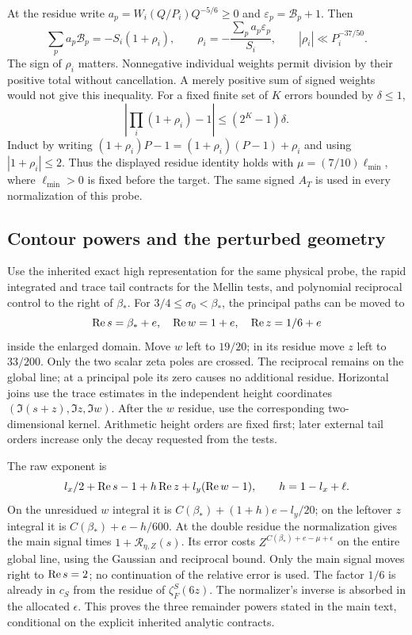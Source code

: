 At the residue write $a_p=W_i(Q/P_i)Q^{-5/6}\ge0$ and
$\varepsilon_p=\mathcal B_p+1$. Then
\[
 \sum_pa_p\mathcal B_p=-S_i(1+\rho_i),\qquad
 \rho_i=-\frac{\sum_pa_p\varepsilon_p}{S_i},\qquad
 |\rho_i|\ll P_i^{-37/50}.
\]
The sign of $\rho_i$ matters. Nonnegative individual weights permit
division by their positive total without cancellation. A merely positive
sum of signed weights would not give this inequality.
For a fixed finite set of $K$ errors bounded by $\delta\le1$,
\[
 \left|\prod_i(1+\rho_i)-1\right|\le(2^K-1)\delta.
\]
Induct by writing $(1+\rho_i)P-1=(1+\rho_i)(P-1)+\rho_i$ and using
$|1+\rho_i|\le2$. Thus the displayed residue identity holds with
$\mu=(7/10)\ell_{\min}$, where $\ell_{\min}>0$ is fixed before the target.
The same signed $A_T$ is used in every normalization of this probe.

\subsection{Contour powers and the perturbed geometry}
Use the inherited exact high representation for the same physical probe,
the rapid integrated and trace tail contracts for the Mellin tests, and
polynomial reciprocal control to the right of $\beta_*$. For
$3/4\le\sigma_0<\beta_*$, the principal paths can be moved to
\[
 \operatorname{Re} s=\beta_*+e,\quad \operatorname{Re} w=1+e,\quad \operatorname{Re} z=1/6+e
\]
inside the enlarged domain. Move $w$ left to $19/20$; in its residue
move $z$ left to $33/200$. Only the two scalar zeta poles are crossed.
The reciprocal remains on the global line; at a principal pole its zero
causes no additional residue. Horizontal joins use the trace estimates
in the independent height coordinates $(\Im(s+z),\Im z,\Im w)$.
After the $w$ residue, use the corresponding two-dimensional kernel.
Arithmetic height orders are fixed first; later external tail orders
increase only the decay requested from the tests.

The raw exponent is
\[
 l_x/2+\operatorname{Re} s-1+h\operatorname{Re} z+l_y(\operatorname{Re} w-1),\qquad h=1-l_x+\ell.
\]
On the unresidued $w$ integral it is
$C(\beta_*)+(1+h)e-l_y/20$; on the leftover $z$ integral it is
$C(\beta_*)+e-h/600$. At the double residue the normalization gives
the main signal times $1+\mathcal R_{\eta,Z}(s)$. Its error costs
$Z^{C(\beta_*)+e-\mu+\epsilon}$ on the entire global line, using the
Gaussian and reciprocal bound. Only the main signal moves right to
$\operatorname{Re} s=2$; no continuation of the relative error is used. The factor
$1/6$ is already in $c_S$ from the residue of $\zeta_F^S(6z)$.
The normalizer's inverse is absorbed in the allocated $\epsilon$.
This proves the three remainder powers stated in the main text,
conditional on the explicit inherited analytic contracts.

